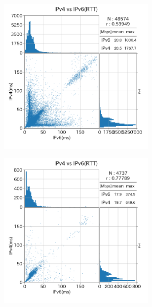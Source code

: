 \begin{figure}[htbp]
\begin{center}
\begin{minipage}[t]{0.48\textwidth}
\begin{center}
\begin{subfigure}[b]{\textwidth}
                \end{subfigure}
            \caption{{\bf 期間(1)}におけるRTT}
            \label{fig:old_Line_rtt}
            \end{center}
        \end{minipage}
        \hfill
        \begin{minipage}[t]{0.48\textwidth}
            \begin{subfigure}[b]{\textwidth}
                \centering
                \includegraphics[width=0.85\textwidth]{fig/new_FTTH_rtt.png}
                \label{new_FTTH_rtt}
            \end{subfigure}
            \begin{subfigure}[b]{\textwidth}
                \centering
                \includegraphics[width=0.85\textwidth]{fig/new_CATV_rtt.png}

\end{subfigure}
\end{minipage}
\end{center}
\end{figure}
